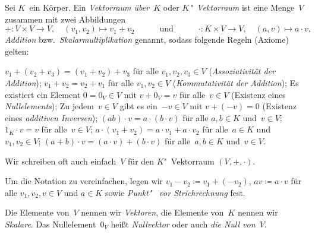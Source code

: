 \documentclass[a4paper]{article}
\begin{document}
\begin{definition}[Vektorraum]
    Sei $K$~ein Körper.  Ein \emph{Vektorraum über~$K$} oder \emph{$K$"~Vektorraum} ist eine Menge~$V$ zusammen mit zwei Abbildungen
    \begin{equation*}
        +\colon V \times V \to V,\quad (v_1, v_2) \mapsto v_1+v_2 \quad\qquad\text{und}\qquad\quad \cdot\colon K \times V \to V,\quad (a, v) \mapsto a\cdot v,
    \end{equation*}
    \emph{Addition} bzw.\ \emph{Skalarmultiplikation} genannt, sodass folgende Regeln (Axiome) gelten:
    \begin{enumerate}[leftmargin=*, widest=(SM0)]
         $v_1+(v_2+v_3) = (v_1+v_2)+v_3$ für alle $v_1, v_2, v_3 \in V$ (\emph{Assoziativität der Addition});\label{ax:vecspace:aa}
         $v_1+v_2 = v_2+v_1$ für alle $v_1, v_2 \in V$ (\emph{Kommutativität der Addition});\label{ax:vecspace:ac}
         Es existiert ein Element $0 = 0_V \in V$ mit $v + 0_V = v$ für alle~$v \in V$ (Existenz eines \emph{Nullelements});\label{ax:vecspace:an}
         Zu jedem~$v \in V$ gibt es ein~$-v \in V$ mit $v+(-v) = 0$ (Existenz eines \emph{additiven Inversen});\label{ax:vecspace:ai}
         $(ab)\cdot v = a\cdot(b\cdot v)$ für alle $a, b \in K$ und~$v \in V$;\label{ax:vecspace:smcomp}
         $1_K \cdot v = v$ für alle~$v \in V$;\label{ax:vecspace:smn}
         $a\cdot(v_1+v_2) = a\cdot v_1 + a\cdot v_2$ für alle~$a \in K$ und $v_1, v_2 \in V$;\label{ax:vecspace:smdv}
         $(a+b)\cdot v = (a\cdot v)+(b\cdot v)$ für alle~$a, b \in K$ und~$v \in V$.\label{ax:vecspace:smdf}
    \end{enumerate}
\end{definition}

Wir schreiben oft auch einfach~$V$ für den $K$"~Vektorraum $(V,+,\cdot)$.

\begin{notation}
    Um die Notation zu vereinfachen, legen wir $v_1-v_2 \coloneqq v_1+(-v_2)$, $av \coloneqq a \cdot v$ für alle $v_1, v_2, v \in V$ und $a \in K$ sowie \emph{Punkt"~ vor Strichrechnung} fest.
\end{notation}

\begin{notation}
    Die Elemente von~$V$ nennen wir \emph{Vektoren}, die Elemente von~$K$ nennen wir \emph{Skalare}. Das Nullelement~$0_V$ heißt \emph{Nullvektor} oder auch \emph{die Null von~$V$}.
\end{notation}
\end{document}
